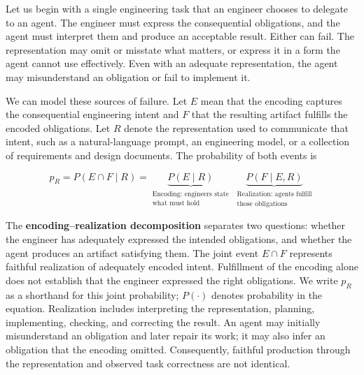 
Let us begin with a single engineering task that an engineer chooses to delegate to an agent. The engineer must express the consequential obligations, and the agent must interpret them and produce an acceptable result. Either can fail. The representation may omit or misstate what matters, or express it in a form the agent cannot use effectively. Even with an adequate representation, the agent may misunderstand an obligation or fail to implement it.

We can model these sources of failure. Let \(E\) mean that the encoding captures the consequential engineering intent and \(F\) that the resulting artifact fulfills the encoded obligations. Let \(R\) denote the representation used to communicate that intent, such as a natural-language prompt, an engineering model, or a collection of requirements and design documents. The probability of both events is

\[
p_R = P(E \cap F \mid R) = \underbrace{P(E \mid R)}_{\substack{\text{Encoding: engineers state}\\\text{what must hold}}} \;\underbrace{P(F \mid E,R)}_{\substack{\text{Realization: agents fulfill}\\\text{those obligations}}}
\]

The \textbf{encoding–realization decomposition} separates two questions: whether the engineer has adequately expressed the intended obligations, and whether the agent produces an artifact satisfying them. The joint event \(E\cap F\) represents faithful realization of adequately encoded intent. Fulfillment of the encoding alone does not establish that the engineer expressed the right obligations. We write \(p_R\) as a shorthand for this joint probability; \(P(\cdot)\) denotes probability in the equation. Realization includes interpreting the representation, planning, implementing, checking, and correcting the result. An agent may initially misunderstand an obligation and later repair its work; it may also infer an obligation that the encoding omitted. Consequently, faithful production through the representation and observed task correctness are not identical.

